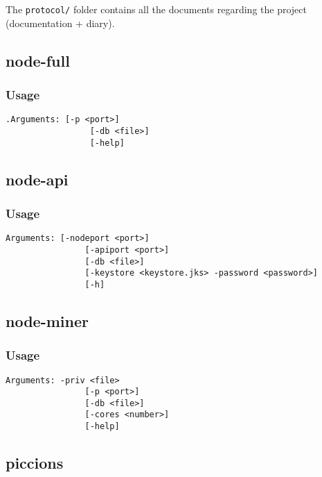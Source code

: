 \documentclass[../documentation.tex]{subfiles}
\begin{document}
The \texttt{protocol/} folder contains all the documents regarding
the project (documentation + diary).

\subsection{node-full}

\subsubsection{Usage}

\begin{lstlisting}[style=generic]
     .Arguments: [-p <port>]
                 [-db <file>]
                 [-help]
\end{lstlisting}

\subsection{node-api}

\subsubsection{Usage}

\begin{lstlisting}[style=generic]
     Arguments: [-nodeport <port>]
                [-apiport <port>]
                [-db <file>]
                [-keystore <keystore.jks> -password <password>]
                [-h]
\end{lstlisting}

\subsection{node-miner}

\subsubsection{Usage}

\begin{lstlisting}[style=generic]
     Arguments: -priv <file>
                [-p <port>]
                [-db <file>]
                [-cores <number>]
                [-help]
\end{lstlisting}

\subsection{piccions}
\end{document}
